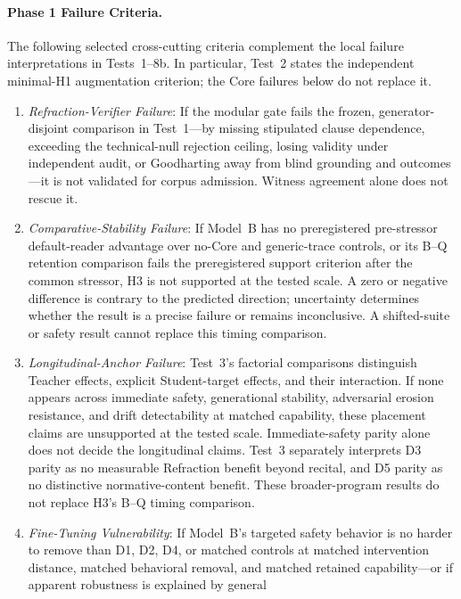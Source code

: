 \documentclass[11pt]{article}
\begin{document}
\paragraph{Phase 1 Failure Criteria.}
The following selected cross-cutting criteria complement the local failure
interpretations in Tests~1--8b. In particular, Test~2 states the independent
minimal-H1 augmentation criterion; the Core failures below do not replace it.
\begin{enumerate}
    \item \emph{Refraction-Verifier Failure}: If the modular gate fails the
    frozen, generator-disjoint comparison in Test~1---by missing stipulated
    clause dependence, exceeding the technical-null rejection ceiling, losing
    validity under independent audit, or Goodharting away from blind grounding
    and outcomes---it is not validated for corpus admission. Witness agreement
    alone does not rescue it.
    \item \emph{Comparative-Stability Failure}: If Model~B has no preregistered
    pre-stressor default-reader advantage over no-Core and generic-trace
    controls, or its B--Q retention comparison fails the preregistered support criterion
    after the common stressor, H3 is not supported at the tested scale. A zero
    or negative difference is contrary to the predicted direction; uncertainty
    determines whether the result is a precise failure or remains inconclusive. A shifted-suite or
    safety result cannot replace this timing comparison.
    \item \emph{Longitudinal-Anchor Failure}: Test~3's factorial comparisons
    distinguish Teacher effects, explicit Student-target effects, and their
    interaction. If none appears across immediate safety, generational stability,
    adversarial erosion resistance, and drift detectability at matched
    capability, these placement claims are unsupported at the tested scale.
    Immediate-safety parity alone does not decide the longitudinal claims.
    Test~3 separately interprets D3 parity as no measurable Refraction benefit
    beyond recital, and D5 parity as no distinctive normative-content benefit.
    These broader-program results do not replace H3's B--Q timing comparison.
    \item \emph{Fine-Tuning Vulnerability}: If Model~B's targeted safety
    behavior is no harder to remove than D1, D2, D4, or matched controls at
    matched intervention distance, matched behavioral removal, and matched
    retained capability---or if apparent robustness is explained by general

\end{enumerate}
\end{document}

